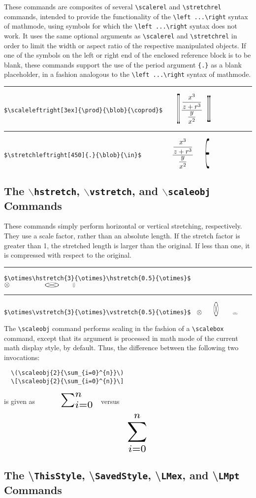 \documentclass{article}
\newcommand\rl{\rule{2em}{0in}}
\let\vb\verb
\begin{document}
These commands are composites of several \vb|\scalerel| and
\vb|\stretchrel| commands, intended to provide the functionality of
the \vb|\left ...\right| syntax of mathmode, using symbols for which
the \vb|\left ...\right| syntax does not work.  It uses the same
optional arguments as \vb|\scalerel| and \vb|\stretchrel| in order
to limit the width or aspect ratio of the respective manipulated
objects.  If one of the symbols on the left or right end of the enclosed
reference block is to be blank, these commands support the use of the
period argument \vb|{.}| as a blank placeholder, in a fashion
analogous to the \vb|\left ...\right| syntax of mathmode.

\rl\vb|$\scaleleftright[3ex]{\prod}{\blob}{\coprod}$  |
$\scaleleftright[3ex]{\prod}{\blob}{\coprod}$

\rl\vb|$\stretchleftright[450]{.}{\blob}{\in}$        |
$\stretchleftright[450]{.}{\blob}{\in}$

\subsection{The $\backslash$\texttt{hstretch},
 $\backslash$\texttt{vstretch}, and $\backslash$\texttt{scaleobj}
 Commands}

These commands simply perform horizontal or vertical stretching,
respectively.  They use a scale factor, rather than an absolute length.
If the stretch factor is greater than 1, the stretched length is larger
than the original.  If less than one, it is compressed with respect to
the original.

\rl\vb|$\otimes\hstretch{3}{\otimes}\hstretch{0.5}{\otimes}$ |
$\otimes\hstretch{3}{\otimes}\hstretch{0.5}{\otimes}$

\rl\vb|$\otimes\vstretch{3}{\otimes}\vstretch{0.5}{\otimes}$ |
$\otimes\vstretch{3}{\otimes}\vstretch{0.5}{\otimes}$

The \vb|\scaleobj| command performs scaling in the fashion of a
\vb|\scalebox| command, except that its argument is processed in math
mode of the current math display style, by default.  Thus, the
difference between the following two invocations:
\begin{verbatim}
  \(\scaleobj{2}{\sum_{i=0}^{n}}\)
  \[\scaleobj{2}{\sum_{i=0}^{n}}\]
\end{verbatim}
is given as
\(\scaleobj{2}{\sum_{i=0}^{n}}\) versus
\[\scaleobj{2}{\sum_{i=0}^{n}}\]

\subsection{The \textbackslash\texttt{ThisStyle}, \textbackslash\texttt{SavedStyle},
\textbackslash\texttt{LMex}, and \textbackslash\texttt{LMpt} Commands}
\end{document}
